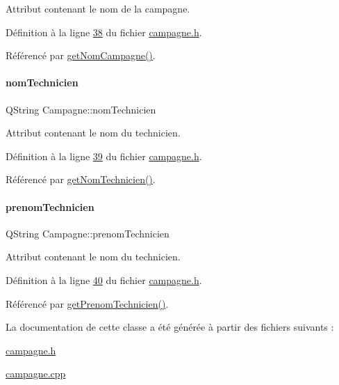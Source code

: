 Attribut contenant le nom de la campagne. 



Définition à la ligne \hyperlink{campagne_8h_source_l00038}{38} du fichier \hyperlink{campagne_8h_source}{campagne.\+h}.



Référencé par \hyperlink{campagne_8cpp_source_l00019}{get\+Nom\+Campagne()}.

\mbox{\label{class_campagne_a6d3e88fb93b38cbcf1bc53cc9fc30f2f}} 
\paragraph{\texorpdfstring{nom\+Technicien}{nomTechnicien}}
{\footnotesize\ttfamily Q\+String Campagne\+::nom\+Technicien\hspace{0.3cm}{\ttfamily [private]}}



Attribut contenant le nom du technicien. 



Définition à la ligne \hyperlink{campagne_8h_source_l00039}{39} du fichier \hyperlink{campagne_8h_source}{campagne.\+h}.



Référencé par \hyperlink{campagne_8cpp_source_l00024}{get\+Nom\+Technicien()}.

\mbox{\label{class_campagne_a9cc37c9671136683b5dac87ff34017bc}} 
\paragraph{\texorpdfstring{prenom\+Technicien}{prenomTechnicien}}
{\footnotesize\ttfamily Q\+String Campagne\+::prenom\+Technicien\hspace{0.3cm}{\ttfamily [private]}}



Attribut contenant le nom du technicien. 



Définition à la ligne \hyperlink{campagne_8h_source_l00040}{40} du fichier \hyperlink{campagne_8h_source}{campagne.\+h}.



Référencé par \hyperlink{campagne_8cpp_source_l00029}{get\+Prenom\+Technicien()}.



La documentation de cette classe a été générée à partir des fichiers suivants \+:\begin{DoxyCompactItemize}
\item 
\hyperlink{campagne_8h}{campagne.\+h}\item 
\hyperlink{campagne_8cpp}{campagne.\+cpp}\end{DoxyCompactItemize}
